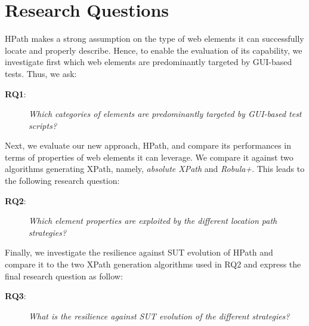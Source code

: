 \section{Research Questions}
\label{sec:hpath-rqs}

HPath makes a strong assumption on the type of web elements it can successfully locate and properly describe. Hence, to enable the evaluation of its capability, we investigate first which web elements are predominantly targeted by GUI-based tests. Thus, we ask:

\begin{description} 
\item[\textbf{RQ1}:]
\emph{Which categories of elements are predominantly targeted by GUI-based test scripts?} 
\end{description} 

Next, we evaluate our new approach, HPath, and compare its performances in terms of properties of web elements it can leverage. We compare it against two algorithms generating XPath, namely, \emph{absolute XPath} and \emph{Robula+}. This leads to the following research question:

\begin{description} 
\item[\textbf{RQ2}:]
\emph{Which element properties are exploited by the different location path strategies?} 
\end{description} 
        
Finally, we investigate the resilience against SUT evolution of HPath and compare it to the two XPath generation algorithms used in RQ2 and express the final research question as follow:

\begin{description} 
\item[\textbf{RQ3}:]
\emph{What is the resilience against SUT evolution of the different strategies?} 
\end{description} 